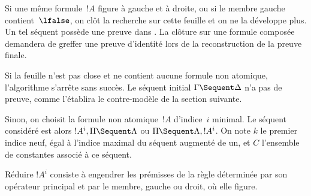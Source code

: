 \documentclass[../../../include/open-logic-section]{subfiles}
\begin{document}
Si une même formule~$!A$ figure à gauche et à droite,
ou si le membre gauche contient~$\lfalse$, on clôt
la recherche sur cette feuille et on ne la développe
plus. Un tel séquent possède une preuve dans .
La clôture sur une formule composée demandera de
greffer une preuve d'identité lors de la reconstruction
de la preuve finale.

Si la feuille n'est pas close et ne contient aucune
formule non atomique, l'algorithme s'arrête sans succès.
Le séquent initial $\Gamma \Sequent \Delta$ n'a pas
de preuve, comme l'établira le contre-modèle de la
section suivante.

Sinon, on choisit la formule non atomique~$!A$
d'indice~$i$ minimal. Le séquent considéré est alors
$!A^i, \Pi \Sequent \Lambda$ ou $\Pi \Sequent \Lambda, !A^i$.
On note $k$ le premier indice neuf, égal à l'indice
maximal du séquent augmenté de un, et $C$ l'ensemble
de constantes associé à ce séquent.

Réduire $!A^i$ consiste à engendrer les prémisses
de la règle déterminée par son opérateur principal
et par le membre, gauche ou droit, où elle figure.
\end{document}
